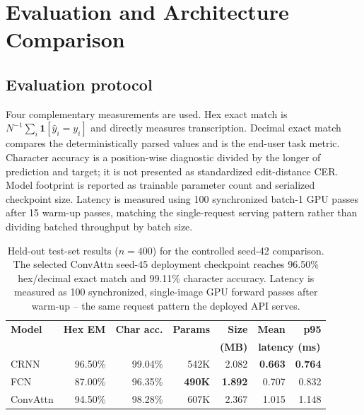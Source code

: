\documentclass[10pt]{article}
\begin{document}
\section{Evaluation and Architecture Comparison}

\subsection{Evaluation protocol}

Four complementary measurements are used. Hex exact match is
$N^{-1}\sum_i\mathbf{1}[\hat{y}_i=y_i]$ and directly measures transcription.
Decimal exact match compares the deterministically parsed values and is the end-user
task metric. Character accuracy is a position-wise diagnostic divided by the longer of
prediction and target; it is not presented as standardized edit-distance CER. Model
footprint is reported as trainable parameter count and serialized checkpoint size.
Latency is measured using 100 synchronized batch-1 GPU passes after 15 warm-up passes,
matching the single-request serving pattern rather than dividing batched throughput by
batch size.

\begin{table}[H]
\centering
\small
\begin{tabular}{@{}lrrrrrr@{}}
\toprule
\textbf{Model} & \textbf{Hex EM} & \textbf{Char acc.} & \textbf{Params}
& \textbf{Size} & \textbf{Mean} & \textbf{p95} \\
 & & & & \textbf{(MB)} & \multicolumn{2}{c}{\textbf{latency (ms)}} \\
\midrule
CRNN      & 96.50\% & 99.04\% & 542K & 2.082 & \textbf{0.663} & \textbf{0.764} \\
FCN       & 87.00\% & 96.35\% & \textbf{490K} & \textbf{1.892} & 0.707 & 0.832 \\
ConvAttn & 94.50\% & 98.28\% & 607K & 2.367 & 1.015 & 1.148 \\
\bottomrule
\end{tabular}
\caption{Held-out test-set results ($n=400$) for the controlled seed-42 comparison.
The selected ConvAttn seed-45 deployment checkpoint reaches 96.50\% hex/decimal exact
match and 99.11\% character accuracy. Latency is measured as 100 synchronized,
single-image GPU forward
passes after warm-up -- the same request pattern the deployed API serves.}
\label{tab:results}
\end{table}
\end{document}
